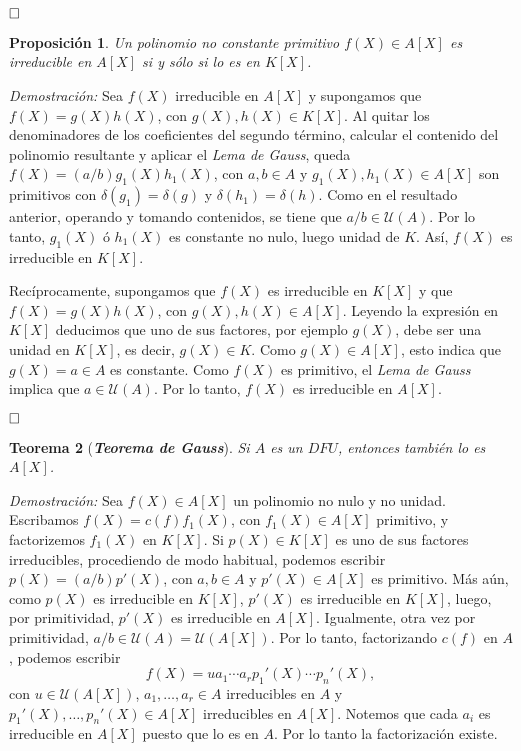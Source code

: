 \documentclass[12pt]{article}
\newtheorem{theorem}{Teorema}[section]
\newtheorem{proposition}[theorem]{Proposición}
\begin{document}
$\hfill \square$

\begin{proposition}Un polinomio no constante primitivo $f(X) \in A[X]$ es irreducible en $A[X]$ si y sólo si lo es en $K[X]$.
\end{proposition}
\emph{Demostración: }Sea $f(X)$ irreducible en $A[X]$ y supongamos que $f(X) = g(X)h(X)$, con $g(X), h(X) \in K[X]$. Al quitar los denominadores de los coeficientes del segundo término, calcular el contenido del polinomio resultante y aplicar el \textit{Lema de Gauss}, queda $f(X) = (a/b)g_1(X)h_1(X)$, con $a,b \in A$ y $g_1(X), h_1(X) \in A[X]$ son primitivos con $\delta (g_1) = \delta (g)$ y $\delta(h_1) = \delta(h)$. Como en el resultado anterior, operando y tomando contenidos, se tiene que $a/b \in \mathcal{U}(A)$. Por lo tanto, $g_1(X)$ ó $h_1(X)$ es constante no nulo, luego unidad de $K$. Así, $f(X)$ es irreducible en $K[X]$.

Recíprocamente, supongamos que $f(X)$ es irreducible en $K[X]$ y que $f(X) = g(X)h(X)$, con $g(X), h(X) \in A[X]$. Leyendo la expresión en $K[X]$ deducimos que uno de sus factores, por ejemplo $g(X)$, debe ser una unidad en $K[X]$, es decir, $g(X) \in K$. Como $g(X) \in A[X]$, esto indica que $g(X) = a \in A$ es constante. Como $f(X)$ es primitivo, el \textit{Lema de Gauss} implica que $a \in \mathcal{U}(A)$. Por lo tanto, $f(X)$ es irreducible en $A[X]$.

$\hfill \square$

\begin{theorem}[\textbf{\textit{Teorema de Gauss}}]
Si $A$ es un $DFU$, entonces también lo es $A[X]$.
\end{theorem}
\emph{Demostración: }Sea $f(X) \in A[X]$ un polinomio no nulo y no unidad. Escribamos $f(X) = c(f)f_1(X)$, con $f_1(X) \in A[X]$ primitivo, y factorizemos $f_1(X)$ en $K[X]$. Si $p(X) \in K[X]$ es uno de sus factores irreducibles, procediendo de modo habitual, podemos escribir $p(X) = (a/b)p'(X)$, con $a,b \in A$ y $p'(X) \in A[X]$ es primitivo. Más aún, como $p(X)$ es irreducible en $K[X]$, $p'(X)$ es irreducible en $K[X]$, luego, por primitividad, $p'(X)$ es irreducible en $A[X]$. Igualmente, otra vez por primitividad, $a/b \in \mathcal{U}(A) = \mathcal{U}(A[X])$. Por lo tanto, factorizando $c(f)$ en $A$, podemos escribir $$f(X) = ua_1 \cdots a_rp_1'(X) \cdots p_n'(X),$$ con $u \in \mathcal{U}(A[X])$, $a_1, \ldots, a_r \in A$ irreducibles en $A$ y $p_1'(X), \ldots, p_n'(X) \in A[X]$ irreducibles en $A[X]$. Notemos que cada $a_i$ es irreducible en $A[X]$ puesto que lo es en $A$. Por lo tanto la factorización existe. 
\end{document}
